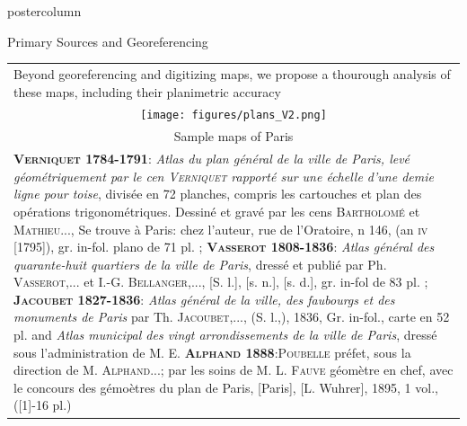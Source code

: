 \documentclass[final,hyperref={pdfpagelabels=false}]{beamer}
\let\oldcite=\cite
\renewcommand{\cite}[1]{\textcolor{ta3chameleon}{\oldcite{#1}}}
\begin{document}
\begin{frame}
\begin{columns}
\begin{column}{0.5\textwidth}
\begin{beamercolorbox}[center,wd=\textwidth]{postercolumn}
\begin{minipage}[t]{.98\textwidth}
\begin{block}{Primary Sources and Georeferencing}
\begin{tabular}{p{}p{}}
        \multicolumn{2}{p{0.98\textwidth}}{Beyond georeferencing and digitizing maps, we propose a thourough analysis of these maps, including their planimetric accuracy~\cite{Dumenieu2013a,Dumenieu2015PhD,Dumenieu2018}}\\
        \multicolumn{2}{c}{\texttt{[image: figures/plans\_V2.png]}}\\
	\multicolumn{2}{c}{\scriptsize Sample maps of Paris}\\%
        \multicolumn{2}{p{0.98\textwidth}}{
          \tiny{
            \textsc{\textbf{Verniquet 1784-1791}:}
            \textit{Atlas du plan général de la ville de Paris, levé géométriquement par le cen \textsc{Verniquet} rapporté sur une échelle d'une demie ligne pour toise}, divisée en 72 planches, compris les cartouches et plan des opérations trigonométriques.
            Dessiné et gravé par les cens \textsc{Bartholomé} et \textsc{Mathieu}...,
            Se trouve à Paris: chez l'auteur, rue de l'Oratoire, n 146, (an \textsc{iv} [1795]), gr. in-fol. plano de 71 pl. ;
            \textsc{\textbf{Vasserot 1808-1836}:}
            \textit{Atlas général des quarante-huit quartiers de la ville de Paris}, dressé et publié par Ph. \textsc{Vasserot},... et I.-G. \textsc{Bellanger},..., [S. l.], [s. n.], [s. d.], gr. in-fol de 83 pl. ;
            \textsc{\textbf{Jacoubet 1827-1836}:}
            \textit{Atlas général de la ville, des faubourgs et des monuments de Paris} par Th. \textsc{Jacoubet},..., (S. l.,), 1836, Gr. in-fol., carte en 52 pl. and \textit{Atlas municipal des vingt arrondissements de la ville de Paris}, dressé sous l'administration de M. E.
            \textsc{\textbf{Alphand 1888}:}\textsc{Poubelle} préfet, sous la direction de M. \textsc{Alphand}...; par les soins de M. L. \textsc{Fauve} géomètre en chef, avec le concours des gémoètres du plan de Paris, [Paris], [L. Wuhrer], 1895, 1 vol., ([1]-16 pl.)
          }
        }\\
	

\end{tabular}
\end{block}
\end{minipage}
\end{beamercolorbox}
\end{column}
\end{columns}
\end{frame}
\end{document}
